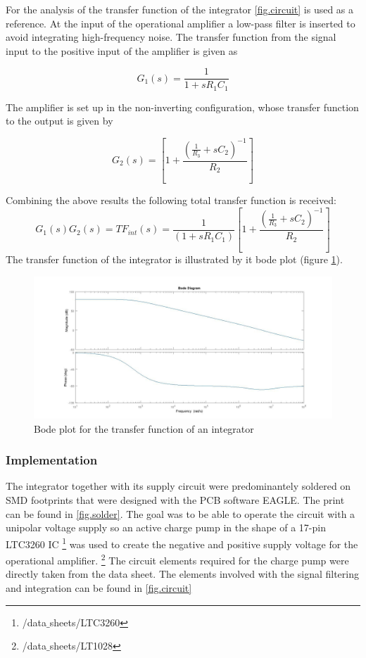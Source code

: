 For the analysis of the transfer function of the integrator \ref{fig.circuit} is used as a reference.
At the input of the operational amplifier a low-pass filter is inserted to avoid integrating high-frequency noise.
The transfer function from the signal input to the positive input of the amplifier is given as

\begin{equation}
  G_1(s)=\frac{1}{1+sR_1C_1}
\end{equation}

The amplifier is set up in the non-inverting configuration, whose transfer function to the output is given by

\begin{equation}
 G_2(s)=\left[1+\frac{\left(\frac{1}{R_3}+sC_2\right)^{-1}}{R_2}\right]
\end{equation}

Combining the above results the following total transfer function is received:
\begin{equation}
	G_1(s)G_2(s)=TF_{int}(s)=\frac{1}{(1+s R_1 C_1)}\left[1+\frac{\left(\frac{1}{R_3}+sC_2\right)^{-1}}{R_2}\right]
\end{equation}
The transfer function of the integrator is illustrated by it bode plot (figure \ref{fig.Bodeplot}). 

\begin{figure}[H]
\includegraphics[width=\textwidth]{figures/Method/integrator/transferfunction_int.jpg}
\caption[Kurze Abbildungsbeschreibung]{Bode plot for the transfer function of an integrator}
\label{fig.Bodeplot}
\end{figure}

\subsubsection{Implementation}
The integrator together with its supply circuit were predominantely soldered on SMD footprints that were designed
with the PCB software EAGLE. The print can be found in \ref{fig.solder}.
The goal was to be able to operate the circuit with a unipolar voltage supply so an active charge pump in the 
shape of a 17-pin LTC3260 IC \footnote{/data$\_$sheets/LTC3260} was used to create the negative and positive supply voltage for the operational amplifier.
\footnote{/data$\_$sheets/LT1028}
The circuit elements required for the charge pump were directly taken from the data sheet. The elements involved with the signal 
filtering and integration can be found in \ref{fig.circuit}
    

